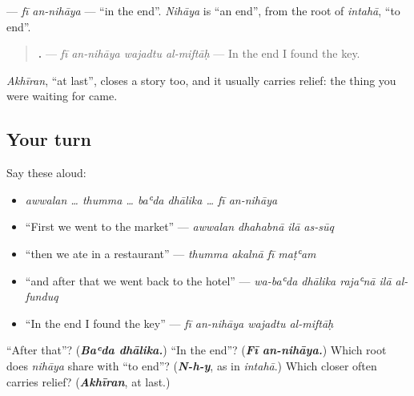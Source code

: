 \begin{grammarlens}[title={Grammar Lens: closing the story}]
\textbf{ } — \emph{fī an-nihāya} — \textquotedblleft{}in the end\textquotedblright{}. \emph{Nihāya} is \textquotedblleft{}an end\textquotedblright{}, from the root of \emph{intahā}, \textquotedblleft{}to end\textquotedblright{}.

\begin{quote}
\textbf{   .} — \emph{fī an-nihāya wajadtu al-miftāḥ} — In the end I found the key.
\end{quote}

\emph{Akhīran}, \textquotedblleft{}at last\textquotedblright{}, closes a story too, and it usually carries relief: the thing you were waiting for came.
\end{grammarlens}

\subsection*{Your turn}
Say these aloud:

\begin{itemize}
\raggedright
  \item \emph{awwalan … thumma … baʿda dhālika … fī an-nihāya}
  \item \textquotedblleft{}First we went to the market\textquotedblright{} — \emph{awwalan dhahabnā ilā as-sūq}
  \item \textquotedblleft{}then we ate in a restaurant\textquotedblright{} — \emph{thumma akalnā fī maṭʿam}
  \item \textquotedblleft{}and after that we went back to the hotel\textquotedblright{} — \emph{wa-baʿda dhālika rajaʿnā ilā al-funduq}
  \item \textquotedblleft{}In the end I found the key\textquotedblright{} — \emph{fī an-nihāya wajadtu al-miftāḥ}
\end{itemize}

\begin{tcolorbox}[breakable,colback=teal!4,colframe=teal!35!black,title={Before you move on}]
\textquotedblleft{}After that\textquotedblright{}? (\emph{\textbf{Baʿda dhālika.}}) \textquotedblleft{}In the end\textquotedblright{}? (\emph{\textbf{Fī an-nihāya.}}) Which root does \emph{nihāya} share with \textquotedblleft{}to end\textquotedblright{}? (\emph{\textbf{N-h-y}}, as in \emph{intahā}.) Which closer often carries relief? (\emph{\textbf{Akhīran}}, at last.)
\end{tcolorbox}
